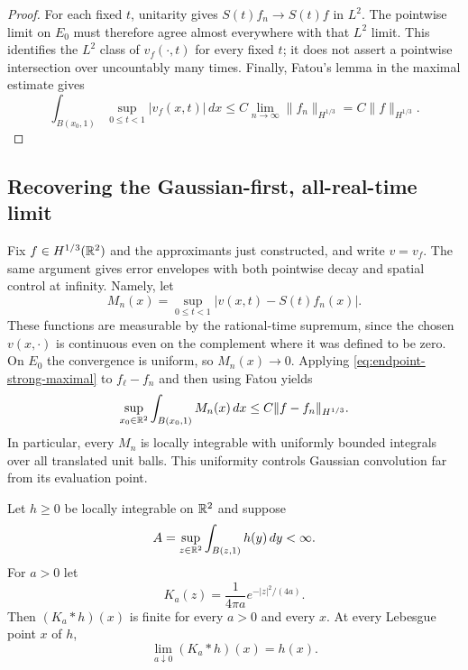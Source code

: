 \begin{proof}
For each fixed $t$, unitarity gives $S(t)f_n\to S(t)f$ in $L^2$.
The pointwise limit on $E_0$ must therefore agree almost everywhere with
that $L^2$ limit.  This identifies the $L^2$ class of $v_f(\cdot,t)$ for
every fixed $t$; it does not assert a pointwise intersection over
uncountably many times.  Finally, Fatou's lemma in the maximal estimate
gives
\[
 \int_{B(x_0,1)}\sup_{0\le t<1}|v_f(x,t)|\,dx
    \le C\lim_{n\to\infty}\|f_n\|_{H^{1/3}}
    =C\|f\|_{H^{1/3}}.
\]
\end{proof}

\subsection{Recovering the Gaussian-first, all-real-time limit}

Fix $f\in H^{1/3}(\mathbb R^2)$ and the approximants just constructed, and write
$v=v_f$.  The same argument gives error envelopes with both pointwise
decay and spatial control at infinity.  Namely, let
\begin{equation}
 M_n(x)=\sup_{0\le t<1}|v(x,t)-S(t)f_n(x)|.
 \label{eq:endpoint-error-envelope}
\end{equation}
These functions are measurable by the rational-time supremum, since
the chosen $v(x,\cdot)$ is continuous even on the complement where it was
defined to be zero.  On $E_0$ the convergence is uniform, so
$M_n(x)\to0$.  Applying \eqref{eq:endpoint-strong-maximal} to
$f_\ell-f_n$ and then using Fatou yields
\begin{equation}
 \sup_{x_0\in\mathbb R^2}\int_{B(x_0,1)}M_n(x)\,dx
       \le C\|f-f_n\|_{H^{1/3}}.
 \label{eq:endpoint-envelope-local-mass}
\end{equation}
In particular, every $M_n$ is locally integrable with uniformly bounded
integrals over all translated unit balls.  This uniformity controls
Gaussian convolution far from its evaluation point.

\begin{lemma}
\label{lem:endpoint-heat-envelope}
Let $h\ge0$ be locally integrable on $\mathbb R^2$ and suppose
\[
 A=\sup_{z\in\mathbb R^2}\int_{B(z,1)}h(y)\,dy<\infty.
\]
For $a>0$ let
\[
 K_a(z)=\frac1{4\pi a}e^{-|z|^2/(4a)}.
\]
Then $(K_a*h)(x)$ is finite for every $a>0$ and every $x$.  At every
Lebesgue point $x$ of $h$,
\begin{equation}
 \lim_{a\downarrow0}(K_a*h)(x)=h(x).
 \label{eq:endpoint-heat-envelope-limit}
\end{equation}
\end{lemma}

